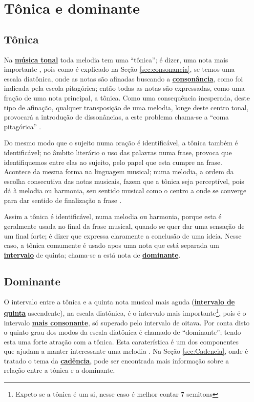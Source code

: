 \section{Tônica e dominante}


\subsection{Tônica}
\label{sec:Tonica}
Na \hyperref[sec:MusicaTonal]{\textbf{música tonal}} toda melodia tem uma ``tônica''; 
é dizer, uma nota mais importante \cite[pp. 19]{holst1998abc}, 
pois como é explicado na Seção \ref{sec:consonancia}, se temos uma escala diatônica,
onde as notas são afinadas buscando a \hyperref[ref:consonancia]{\textbf{consonância}},
como foi indicada pela escola pitagórica; então todas as notas são expressadas,
como uma fração de uma nota principal, a tônica. 
Como uma consequência inesperada, deste tipo de afinação, 
qualquer transposição de uma melodia, longe deste centro tonal, 
provocará a introdução de dissonâncias,
a este problema chama-se a ``coma pitagórica'' \cite[pp. 24]{arbones2012armonia}.
 

Do mesmo modo que o sujeito numa oração é identificável, a tônica também é identificável;
no âmbito literário o uso das palavras numa frase, 
provoca que identifiquemos entre elas ao sujeito, pelo papel que esta cumpre na frase.
Acontece da mesma forma na linguagem musical; numa melodia,
a ordem da escolha consecutiva das notas musicais, 
fazem que a tônica seja perceptível, pois dá à melodia ou harmonia, 
seu sentido musical como o centro a onde se converge para dar sentido de finalização a frase \cite[pp. 19]{holst1998abc}.

Assim a tônica é identificável, numa melodia ou harmonia, 
porque esta é geralmente  usada no final  da frase musical, 
quando se quer dar uma sensação de um final forte;
é dizer que expressa claramente a conclusão de uma ideia.
Nesse caso, a tônica comumente é usado apos uma nota que está separada um 
\hyperref[sec:intervalomelodico]{\textbf{intervalo}} de quinta;
chama-se a está nota de \hyperref[sec:dominante]{\textbf{dominante}}.

\subsection{Dominante}
\label{sec:dominante}

O intervalo entre a tônica e a quinta nota musical mais aguda 
(\hyperref[fig:abc-iquinta2]{\textbf{intervalo de quinta}} ascendente), 
na escala diatônica, 
é o intervalo mais importante\footnote{Expeto se a tônica é um si, nesse caso é melhor contar 7 semitons},
pois é o intervalo \hyperref[tab:pitagorascromatica2]{\textbf{mais consonante}}, 
só superado pelo intervalo de oitava. 
Por conta disto o quinto grau dos modos da escala diatônica é chamado  de ``dominante'';
tendo esta uma forte atração com a tônica. 
Esta caraterística é um dos componentes que ajudam a manter interessante  uma melodia \cite[pp. 24]{holst1998abc}.
Na Seção \ref{sec:Cadencia}, onde é tratado o tema da \hyperref[sec:Cadencia]{\textbf{cadência}},
pode ser encontrada mais informação sobre a relação entre a tônica e a dominante.

